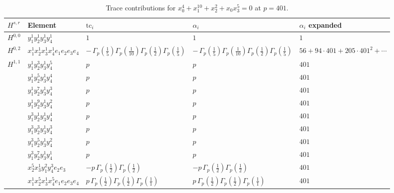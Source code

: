 \documentclass[11pt]{article}
\begin{document}
\begin{table}[ht]
\centering
\caption{Trace contributions for $x_0^{4} + x_1^{10} + x_2^{2} + x_0 x_3^{5} = 0$ at $p=401$.}\label{tab:deformed-55}
\renewcommand{\arraystretch}{1.1}
{\scriptsize
\begin{tabular}{@{}lllll@{}}
\toprule
$H^{s,r}$ & Element & $\mathrm{tc}_i$ & $\alpha_i$ & $\alpha_i$ expanded \\
\midrule
$H^{0,0}$ & $y_{1}^{1} y_{2}^{1} y_{3}^{1} y_{4}^{1}$ & $1$ & $1$ & $1$ \\
\midrule
$H^{0,2}$ & $x_{1}^{1} x_{2}^{1} x_{3}^{1} x_{4}^{1}  e_{1} e_{2} e_{3} e_{4}$ & $- \, \Gamma_p \left( \frac{1}{5} \right) \Gamma_p \left( \frac{1}{10} \right) \Gamma_p \left( \frac{1}{2} \right) \Gamma_p \left( \frac{1}{5} \right)$ & $- \, \Gamma_p \left( \frac{1}{5} \right) \Gamma_p \left( \frac{1}{10} \right) \Gamma_p \left( \frac{1}{2} \right) \Gamma_p \left( \frac{1}{5} \right)$ & $56{+}94{\cdot}401{+}205{\cdot}401^{2}{+}\cdots$ \\
\midrule
$H^{1,1}$ & $y_{1}^{1} y_{2}^{3} y_{3}^{1} y_{4}^{5}$ & $p \,$ & $p \,$ & $401$ \\
 & $y_{1}^{1} y_{2}^{5} y_{3}^{1} y_{4}^{4}$ & $p \,$ & $p \,$ & $401$ \\
 & $y_{1}^{1} y_{2}^{7} y_{3}^{1} y_{4}^{3}$ & $p \,$ & $p \,$ & $401$ \\
 & $y_{1}^{1} y_{2}^{9} y_{3}^{1} y_{4}^{2}$ & $p \,$ & $p \,$ & $401$ \\
 & $y_{1}^{3} y_{2}^{1} y_{3}^{1} y_{4}^{4}$ & $p \,$ & $p \,$ & $401$ \\
 & $y_{1}^{3} y_{2}^{3} y_{3}^{1} y_{4}^{3}$ & $p \,$ & $p \,$ & $401$ \\
 & $y_{1}^{3} y_{2}^{5} y_{3}^{1} y_{4}^{2}$ & $p \,$ & $p \,$ & $401$ \\
 & $y_{1}^{3} y_{2}^{7} y_{3}^{1} y_{4}^{1}$ & $p \,$ & $p \,$ & $401$ \\
 & $x_{2}^{5} x_{3}^{1} y_{1}^{2} y_{4}^{3} e_{2} e_{3}$ & $- p \, \Gamma_p \left( \frac{1}{2} \right) \Gamma_p \left( \frac{1}{2} \right)$ & $- p \, \Gamma_p \left( \frac{1}{2} \right) \Gamma_p \left( \frac{1}{2} \right)$ & $401$ \\
 & $x_{1}^{1} x_{2}^{5} x_{3}^{1} x_{4}^{5}  e_{1} e_{2} e_{3} e_{4}$ & $p \, \Gamma_p \left( \frac{1}{2} \right) \Gamma_p \left( \frac{1}{2} \right) \Gamma_p \left( \frac{1}{1} \right)$ & $p \, \Gamma_p \left( \frac{1}{2} \right) \Gamma_p \left( \frac{1}{2} \right) \Gamma_p \left( \frac{1}{1} \right)$ & $401$ \\

\end{tabular}}
\end{table}
\end{document}
